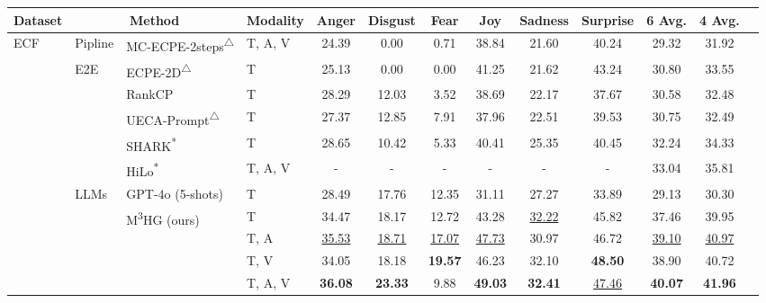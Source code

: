 \documentclass[11pt]{article}
\begin{document}
\begin{table}[htbp]
    \centering
    \scriptsize
    \begin{tabular}{llllccccccccc}
        \toprule
        \textbf{Dataset} & \multicolumn{2}{c}{\textbf{Method}} & \textbf{Modality} & \textbf{Anger} & \textbf{Disgust} & \textbf{Fear} & \textbf{Joy} & \textbf{Sadness} & \textbf{Surprise} & \textbf{6 Avg.} & \textbf{4 Avg.} \\
        \midrule
        \multirow{13}{*}{ECF} 
        & Pipline & MC-ECPE-2steps\textsuperscript{$\triangle$} & T, A, V & 24.39 & 0.00 & 0.71 & 38.84 & 21.60 & 40.24 & 29.32 & 31.92 \\
        \cmidrule{2-12}
        & \multirow{5}{*}{E2E} 
        & ECPE-2D\textsuperscript{$\triangle$} & T & 25.13 & 0.00 & 0.00 & 41.25 & 21.62 & 43.24 & 30.80 & 33.55 \\
        & & RankCP & T & 28.29 & 12.03 & 3.52 & 38.69 & 22.17 & 37.67 & 30.58 & 32.48 \\
        & & UECA-Prompt\textsuperscript{$\triangle$} & T &  27.37 & 12.85 & 7.91 & 37.96 & 22.51 & 39.53 & 30.75 & 32.49 \\
        & & SHARK\textsuperscript{*} & T & 28.65 & 10.42 & 5.33 & 40.41 & 25.35 & 40.45 & 32.24 & 34.33 \\
        & & HiLo\textsuperscript{*}& T, A, V &-&-&-&-&-&-& 33.04 & 35.81 \\
        \cmidrule{2-12}
        & \multirow{1}{*}{LLMs}
        & GPT-4o (5-shots) & T & 28.49 & 17.76 & 12.35 & 31.11 & 27.27 & 33.89 & 29.13 & 30.30\\
       \cmidrule{2-12}
       & \multirow{4}{*}{}
       & \multirow{4}{*}{M\textsuperscript{3}HG (ours)} 
       & T & 34.47 & 18.17 & 12.72 & 43.28 & \underline{32.22} & 45.82 &37.46 & 39.95 \\
       & & & T, A & \underline{35.53} & \underline{18.71}  & \underline{17.07}  & \underline{47.73} & 30.97 & 46.72 & \underline{39.10} & \underline{40.97} \\
       & & & T, V & 34.05 & 18.18 & \textbf{19.57} & 46.23 & 32.10 & \textbf{48.50} & 38.90 & 40.72 \\
       & & & T, A, V & \textbf{36.08} & \textbf{23.33} & 9.88 & \textbf{49.03} & \textbf{32.41}  & \underline{47.46} & \textbf{40.07} & \textbf{41.96} \\


\end{tabular}
\end{table}
\end{document}

